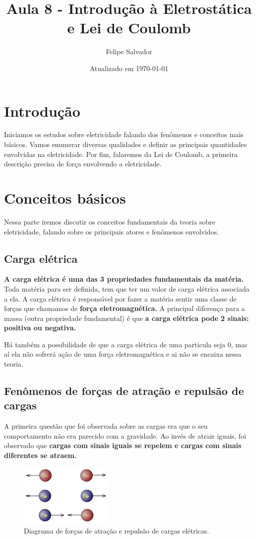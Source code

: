 \documentclass[12pt]{extarticle}
\title{Aula 8 - Introdução à Eletrostática e Lei de Coulomb}
\author{Felipe Salvador}
\date{Atualizado em \today}
\newcommand{\<}{\langle}
\renewcommand{\>}{\rangle}
\theoremstyle{definition}
\begin{document}
\maketitle

\section{Introdução}
Iniciamos os estudos sobre eletricidade falando dos fenômenos e conceitos mais básicos. Vamos enumerar diversas qualidades e definir as principais quantidades envolvidas na eletricidade. Por fim, falaremos da Lei de Coulomb, a primeira descrição precisa de força envolvendo a eletricidade.

\section{Conceitos básicos}

Nessa parte iremos discutir os conceitos fundamentais da teoria sobre eletricidade, falando sobre os principais atores e fenômenos envolvidos.
\subsection{Carga elétrica}

\textbf{A carga elétrica é uma das 3 propriedades fundamentais da matéria.} Toda matéria para ser definida, tem que ter um valor de carga elétrica associada a ela. A carga elétrica é responsável por fazer a matéria sentir uma classe de forças que chamamos de \textbf{força eletromagnética.} A principal diferença para a massa (outra propriedade fundamental) é que \textbf{a carga elétrica pode 2 sinais: positiva ou negativa.} 

Há também a possibilidade de que a carga elétrica de uma partícula seja 0, mas aí ela não sofrerá ação de uma força eletromagnética e ai não se encaixa nessa teoria.

\subsection{Fenômenos de forças de atração e repulsão de cargas}

A primeira questão que foi observada sobre as cargas era que o seu comportamento não era parecido com a gravidade. Ao invés de atrair iguais, foi observado que \textbf{cargas com sinais iguais se repelem e cargas com sinais diferentes se atraem.}
\begin{figure}[H]
    \centering
    \includegraphics[width=0.4\textwidth]{cargas-eletricas.jpg}
    \caption{Diagrama de forças de atração e repulsão de cargas elétricas.}
    \label{fig:ex_1}
\end{figure}
\end{document}
